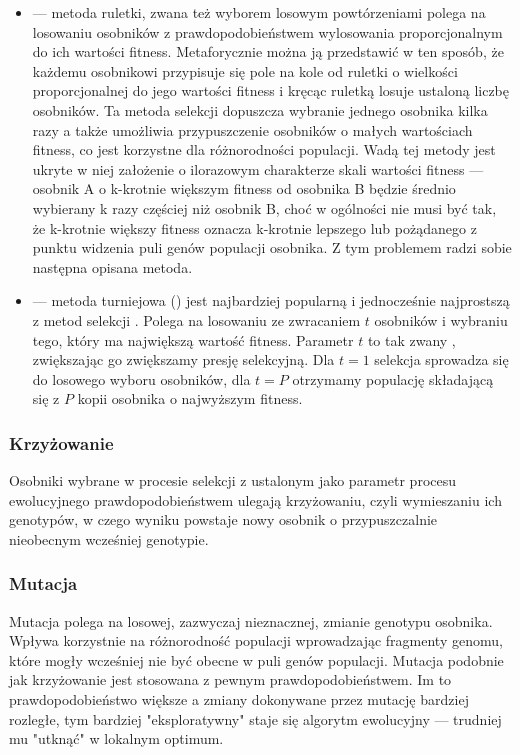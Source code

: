 \begin{itemize}

\item {} --- metoda ruletki, zwana też wyborem losowym powtórzeniami  polega na losowaniu osobników z prawdopodobieństwem wylosowania proporcjonalnym do ich wartości fitness. Metaforycznie można ją przedstawić w ten sposób, że każdemu osobnikowi przypisuje się pole na kole od ruletki o wielkości proporcjonalnej do jego wartości fitness i kręcąc ruletką losuje ustaloną liczbę osobników. 
Ta metoda selekcji dopuszcza wybranie jednego osobnika kilka razy a także umożliwia przypuszczenie osobników o małych wartościach fitness, co jest korzystne dla różnorodności populacji. Wadą tej metody jest ukryte w niej założenie o ilorazowym charakterze skali wartości fitness --- osobnik A o k-krotnie większym fitness od osobnika B będzie średnio wybierany k razy częściej niż osobnik B, choć w ogólności nie musi być tak, że k-krotnie większy fitness oznacza k-krotnie lepszego lub pożądanego z punktu widzenia puli genów populacji osobnika. Z tym problemem radzi sobie następna opisana metoda.

\item {} --- metoda turniejowa () jest najbardziej popularną i jednocześnie najprostszą z metod selekcji \cite{Luke2009Metaheuristics}. Polega na losowaniu ze zwracaniem $ t $ osobników i wybraniu tego, który ma największą wartość fitness. Parametr $ t $ to tak zwany , zwiększając go zwiększamy presję selekcyjną. Dla $ t = 1 $ selekcja sprowadza się do losowego wyboru osobników, dla $ t = P $ otrzymamy populację składającą się z $ P $ kopii osobnika o najwyższym fitness.	

\end{itemize}


\subsubsection{Krzyżowanie}
Osobniki wybrane w procesie selekcji z ustalonym jako parametr procesu ewolucyjnego prawdopodobieństwem ulegają krzyżowaniu, czyli wymieszaniu ich genotypów, w czego wyniku powstaje nowy osobnik o przypuszczalnie nieobecnym wcześniej genotypie.

\subsubsection{Mutacja}
\label{sec:mutation}
Mutacja polega na losowej, zazwyczaj nieznacznej, zmianie genotypu osobnika. Wpływa korzystnie na różnorodność populacji wprowadzając fragmenty genomu, które mogły wcześniej nie być obecne w puli genów populacji. Mutacja podobnie jak krzyżowanie jest stosowana z pewnym prawdopodobieństwem. Im to prawdopodobieństwo większe a zmiany dokonywane przez mutację bardziej rozległe, tym bardziej "eksploratywny" staje się algorytm ewolucyjny --- trudniej mu "utknąć" w lokalnym optimum.

